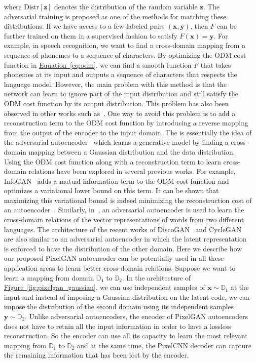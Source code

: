 \documentclass{article}
\newcommand{\myeq}[1]{\hyperref[eq:#1]{Equation~\ref*{eq:#1}}}
\newcommand{\myfig}[1]{\hyperref[fig:#1]{Figure~\ref*{fig:#1}}}
\begin{document}
where $\text{Distr}[\mathbf{z}]$ denotes the distribution of the random variable $\mathbf{z}$. The adversarial training is proposed as one of the methods for matching these distributions. If we have access to a few labeled pairs $(\mathbf{x},\mathbf{y})$, then $F$ can be further trained on them in a supervised fashion to satisfy $F(\mathbf{x})=\mathbf{y}$. For example, in speech recognition, we want to find a cross-domain mapping from a sequence of phonemes to a sequence of characters. By optimizing the ODM cost function in \myeq{odm}, we can find a smooth function $F$ that takes phonemes at its input and outputs a sequence of characters that respects the language model. However, the main problem with this method is that the network can learn to ignore part of the input distribution and still satisfy the ODM cost function by its output distribution. This problem has also been observed in other works such as~\citep{discogan}. One way to avoid this problem is to add a reconstruction term to the ODM cost function by introducing a reverse mapping from the output of the encoder to the input domain. The is essentially the idea of the adversarial autoencoder~\citep{aae} which learns a generative model by finding a cross-domain mapping between a Gaussian distribution and the data distribution. Using the ODM cost function along with a reconstruction term to learn cross-domain relations have been explored in several previous works. For example, InfoGAN~\citep{infogan} adds a mutual information term to the ODM cost function and optimizes a variational lower bound on this term. It can be shown that maximizing this variational bound is indeed minimizing the reconstruction cost of an autoencoder~\citep{im}. Similarly, in~\citep{cross-domain-nlp, zhangadversarial}, an adversarial autoencoder is used to learn the cross-domain relations of the vector representations of words from two different languages. The architecture of the recent works of DiscoGAN~\citep{discogan} and CycleGAN~\citep{cyclegan} are also similar to an adversarial autoencoder in which the latent representation is enforced to have the distribution of the other domain. Here we describe how our proposed PixelGAN autoencoder can be potentially used in all these application areas to learn better cross-domain relations. Suppose we want to learn a mapping from domain $\mathbb{D}_1$ to $\mathbb{D}_2$. In the architecture of \myfig{pixelgan_gaussian}, we can use independent samples of $\mathbf{x} \sim \mathbb{D}_1$ at the input and instead of imposing a Gaussian distribution on the latent code, we can impose the distribution of the second domain using its independent samples $\mathbf{y} \sim \mathbb{D}_2$. Unlike adversarial autoencoders, the encoder of PixelGAN autoencoders does not have to retain all the input information in order to have a lossless reconstruction. So the encoder can use all its capacity to learn the most relevant mapping from $\mathbb{D}_1$ to $\mathbb{D}_2$ and at the same time, the PixelCNN decoder can capture the remaining information that has been lost by the encoder.
\end{document}
